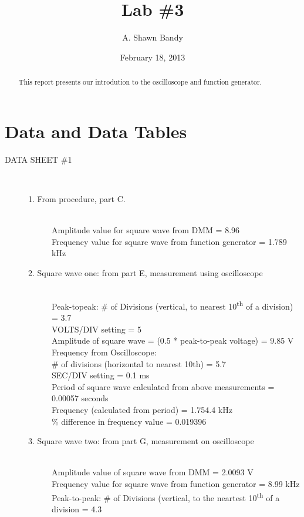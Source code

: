\documentclass{article}
\begin{document}
\title{Lab \#3}
\author{A. Shawn Bandy}
\date{February 18, 2013}
\maketitle
\begin{abstract}
This report presents our introdution to the oscilloscope and function generator.  
\end{abstract}
\section{Data and Data Tables}
\begin{description}
\item[DATA SHEET \#1] \hfill \\
\begin{description}
\item[1. From procedure, part C.] \hfill \\
Amplitude value for square wave from DMM = 8.96 \\
Frequency value for square wave from function generator = 1.789 kHz 
\item[2. Square wave one: from part E, measurement using oscilloscope] \hfill \\
Peak-topeak: \# of Divisions (vertical, to nearest 10\textsuperscript{th} of a division) = 3.7 \\
VOLTS/DIV setting = 5 \\
Amplitude of square wave = (0.5 * peak-to-peak voltage) = 9.85 V \\
Frequency from Oscilloscope: \\
\# of divisions (horizontal to nearest 10th) = 5.7 \\
SEC/DIV setting = 0.1 ms \\
Period of square wave calculated from above measurements = 0.00057  seconds\\
Frequency (calculated from period) = 1.754.4 kHz\\
\% difference in frequency value  = 0.019396
\item[3. Square wave two: from part G, measurement on oscilloscope] \hfill \\
Amplitude value of square wave from DMM = 2.0093 V \\
Frequency value for square wave from function generator = 8.99 kHz \\
Peak-to-peak: \# of Divisions (vertical, to the neartest 10\textsuperscript{th} of a division = 4.3 \\

\end{description}
\end{description}
\end{document}
